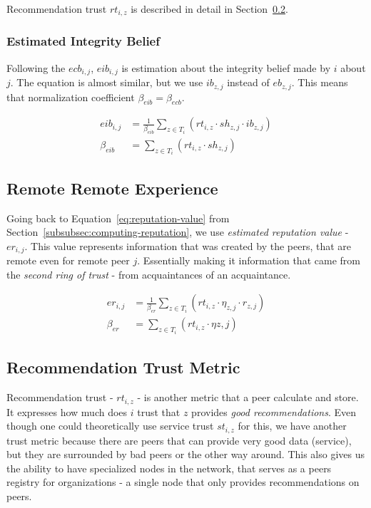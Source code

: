 \noindent
Recommendation trust $rt_{i, z}$ is described in detail in Section~\ref{subsec:recommendation-trust-metric}.

\subsubsection{Estimated Integrity Belief}
Following the $ecb_{i,j}$, $eib_{i,j}$ is estimation about the integrity belief made by $i$ about $j$.
The equation is almost similar, but we use $ib_{z,j}$ instead of $eb_{z,j}$.
This means that normalization coefficient $\beta_{eib} = \beta_{ecb}$.

\begin{equation}
\label{eq:estimated-integrity-belief}
\begin{split}
    eib_{i,j} &= \frac{1}{\beta_{eib}} \sum_{z \in T_{i}} \left(rt_{i, z} \cdot sh_{z, j} \cdot ib_{z, j}\right) \\
    \beta_{eib} &= \sum_{z \in T_{i}} \left(rt_{i, z} \cdot sh_{z, j}\right)
\end{split}
\end{equation}

\subsection{Remote Remote Experience}
Going back to Equation~\ref{eq:reputation-value} from Section~\ref{subsubsec:computing-reputation}, we use \textit{estimated reputation value} - $er_{i,j}$.
This value represents information that was created by the peers, that are remote even for remote peer $j$. 
Essentially making it information that came from the \textit{second ring of trust} - from acquaintances of an acquaintance.

\begin{equation}
\label{eq:estimated-reputation}
\begin{split}
    er_{i,j} &= \frac{1}{\beta_{er}} \sum_{z \in T_{i}} \left(rt_{i, z} \cdot \eta_{z, j} \cdot r_{z, j}\right) \\
    \beta_{er} &= \sum_{z \in T_{i}} \left(rt_{i, z} \cdot \eta{z, j}\right)
\end{split}
\end{equation}

\subsection{Recommendation Trust Metric}
\label{subsec:recommendation-trust-metric}
Recommendation trust - $rt_{i,z}$ - is another metric that a peer calculate and store. It expresses how much does $i$ trust that $z$ provides \textit{good recommendations}.
Even though one could theoretically use service trust $st_{i, z}$ for this,
we have another trust metric because there are peers that can provide very good data (service), but they are surrounded by bad peers or the other way around.
This also gives us the ability to have specialized nodes in the network, that serves as a peers registry for organizations - a single node that only provides recommendations on peers.

